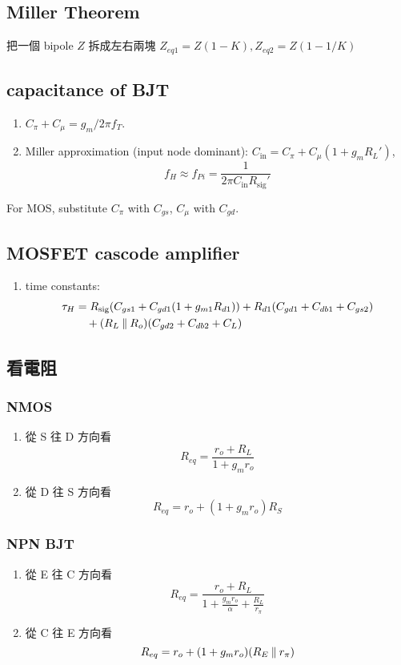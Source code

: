 \documentclass[12pt, a4paper]{article}
\begin{document}
\subsection{Miller Theorem}
把一個 bipole $Z$ 拆成左右兩塊
$Z_{eq1} = Z (1-K), Z_{eq2} = Z (1 - 1/K)$
\subsection{capacitance of BJT}
\begin{enumerate}
  \item $C_\pi + C_\mu = g_m / 2\pi f_T$.
  \item Miller approximation (input node dominant):
    $C_\text{in} = C_\pi + C_\mu(1 + g_mR_L')$,
    \[ f_H \approx f_{Pi} = \frac{1}{2\pi C_\text{in} R_\text{sig}'} \]
\end{enumerate}
For MOS, substitute $C_\pi$ with $C_{gs}$, $C_\mu$ with $C_{gd}$.
\subsection{MOSFET cascode amplifier}
\begin{enumerate}
  \item time constants:
    \begin{align*}
      \tau_{H} &= R_\text{sig} (C_{gs1} + C_{gd1}(1+g_{m1}R_{d1}))
      + R_{d1}(C_{gd1} + C_{db1} + C_{gs2}) \\
      & \quad + (R_L \mathbin{\|} R_o) (C_{gd2} + C_{db2} + C_L)
    \end{align*}
\end{enumerate}
\subsection{看電阻}
\subsubsection{NMOS}
\begin{enumerate}
  \item 從 S 往 D 方向看 
    \[ R_{eq} = \frac{r_o + R_L}{1+g_mr_o} \]
  \item 從 D 往 S 方向看 
    \[ R_{eq} = r_o + (1 + g_m r_o) R_S \]
\end{enumerate}
\subsubsection{NPN BJT}
\begin{enumerate}
  \item 從 E 往 C 方向看 
    \[ R_{eq} = \frac{r_o + R_L}{1+\frac{g_mr_o}{\alpha} + \frac{R_L}{r_\pi}} \]
  \item 從 C 往 E 方向看 
    \[ R_{eq} = r_o + (1 + g_mr_o) (R_E \mathbin{\|} r_\pi) \]
\end{enumerate}
\end{document}
